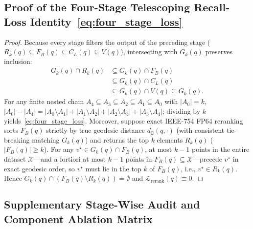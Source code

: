 \subsection{Proof of the Four-Stage Telescoping Recall-Loss Identity~\eqref{eq:four_stage_loss}}
\begin{proof}
Because every stage filters the output of the preceding stage ($R_k(q) \subseteq F_B(q) \subseteq C_L(q) \subseteq V(q)$), intersecting with $G_k(q)$ preserves inclusion:
\begin{equation}
  \begin{aligned}
    G_k(q) \cap R_k(q) &\subseteq G_k(q) \cap F_B(q) \\
    &\subseteq G_k(q) \cap C_L(q) \\
    &\subseteq G_k(q) \cap V(q) \subseteq G_k(q).
  \end{aligned}
\end{equation}
For any finite nested chain $A_4 \subseteq A_3 \subseteq A_2 \subseteq A_1 \subseteq A_0$ with $|A_0| = k$, $|A_0| - |A_4| = |A_0 \setminus A_1| + |A_1 \setminus A_2| + |A_2 \setminus A_3| + |A_3 \setminus A_4|$; dividing by $k$ yields~\eqref{eq:four_stage_loss}.
Moreover, suppose exact IEEE-754 FP64 reranking sorts $F_B(q)$ strictly by true geodesic distance $d_{\mathbb{B}}(q, \cdot)$ (with consistent tie-breaking matching $G_k(q)$) and returns the top $k$ elements $R_k(q)$ ($|F_B(q)| \ge k$).
For any $v^\star \in G_k(q) \cap F_B(q)$, at most $k - 1$ points in the entire dataset $\mathcal{X}$---and a fortiori at most $k - 1$ points in $F_B(q) \subseteq \mathcal{X}$---precede $v^\star$ in exact geodesic order, so $v^\star$ must lie in the top $k$ of $F_B(q)$, i.e., $v^\star \in R_k(q)$.
Hence $G_k(q) \cap (F_B(q) \setminus R_k(q)) = \emptyset$ and $\mathcal{L}_{\mathrm{rerank}}(q) \equiv 0$.
\end{proof}

\subsection{Supplementary Stage-Wise Audit and Component Ablation Matrix}

